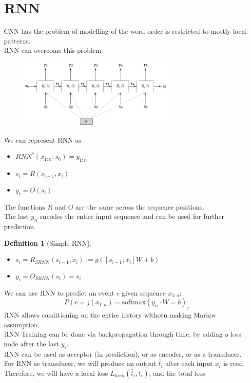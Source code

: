 \documentclass[12pt]{article}
\newtheorem{definition}{Definition}[section]
\theoremstyle{definition}
\begin{document}
\section{RNN}
CNN has the problem of modelling of the word order is restricted to mostly local patterns.\\
RNN can overcome this problem.
\begin{figure}[h]
\centering
\includegraphics[width=0.7\textwidth]{rnn.jpg}
\end{figure}
We can represent RNN as
\begin{itemize}
	\item $RNN^{\ast}(x_{1:n}: s_0) = y_{1:n}$
	\item $s_i = R(s_{i-1}, x_i)$
	\item $y_i = O(s_i)$
\end{itemize}
The functions $R$ and $O$ are the same across the sequence positions.\\
The last $y_n$ encodes the entire input sequence and can be used for further prediction.\\
\begin{definition}[Simple RNN]
\hfill\\\normalfont 
\begin{itemize}
\item $s_i = R_{SRNN}(s_{i-1}, x_i):= g([s_{i-1}; x_i]W + b)$
\item $y_i = O_{SRNN}(s_i) = s_i$
\end{itemize}
\end{definition}
We can use RNN to predict an event $e$ given sequence $x_{1:n}$:
\[
P(e=j\mid x_{1:n}) = \text{softmax}(y_n\cdot W = b)_j
\]
RNN allows conditioning on the entire history withotu making Markov assumption.\\
RNN Training can be done via backpropagation through time, by adding a loss node after the last $y_i$.\\
RNN can be used as acceptor (in prediction), or as encoder, or as a transducer.\\
For RNN as transducer, we will produce an output $\hat{t}_i$ after each input $x_i$ is read. Therefore, we will have a local loss $L_{local}(\hat{t}_i, t_i)$, and the total loss
\end{document}
